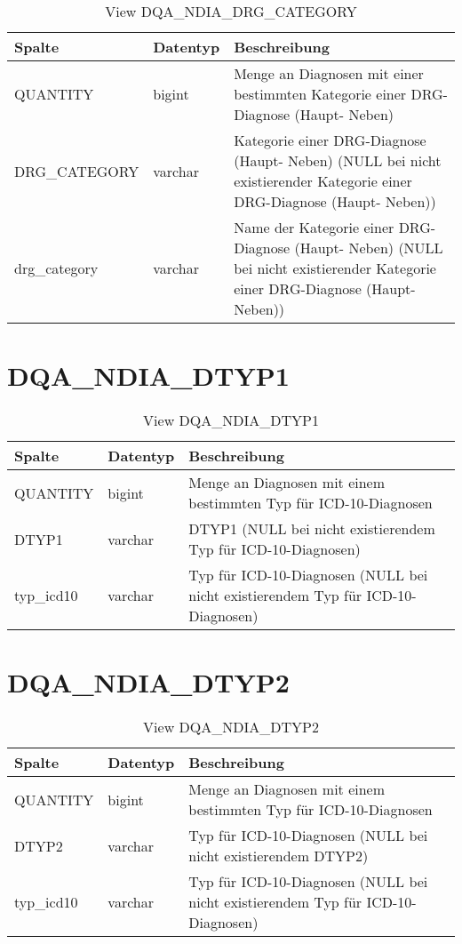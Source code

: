  \begin{table}[ht]
    \centering
    \caption{View DQA\_NDIA\_DRG\_CATEGORY}
    \label{tab:dqandiadrgcategory}
    \begin{tabular}{||l|l|p{10cm}||}
      \hline
      Spalte & Datentyp & Beschreibung \\ [0.5ex] \hline \hline
QUANTITY & bigint & Menge an Diagnosen mit einer bestimmten Kategorie einer DRG-Diagnose (Haupt- Neben) \\ \hline
DRG\_CATEGORY & varchar & Kategorie einer DRG-Diagnose (Haupt- Neben) (NULL bei nicht existierender Kategorie einer DRG-Diagnose (Haupt- Neben))\\ \hline
drg\_category & varchar & Name der Kategorie einer DRG-Diagnose (Haupt- Neben) (NULL bei nicht existierender Kategorie einer DRG-Diagnose (Haupt- Neben))\\ \hline
    \end{tabular}
  \end{table}

  \section{DQA\_NDIA\_DTYP1}

  \begin{table}[ht]
    \centering
    \caption{View DQA\_NDIA\_DTYP1}
    \label{tab:dqandiadtyp1}
    \begin{tabular}{||l|l|p{10cm}||}
      \hline
      Spalte & Datentyp & Beschreibung \\ [0.5ex] \hline \hline
QUANTITY & bigint & Menge an Diagnosen mit einem bestimmten Typ für ICD-10-Diagnosen \\ \hline
DTYP1 & varchar & DTYP1 (NULL bei nicht existierendem Typ für ICD-10-Diagnosen)\\ \hline
typ\_icd10 & varchar & Typ für ICD-10-Diagnosen (NULL bei nicht existierendem Typ für ICD-10-Diagnosen)\\ \hline
    \end{tabular}
  \end{table}
\clearpage
  \section{DQA\_NDIA\_DTYP2}

  \begin{table}[ht]
    \centering
    \caption{View DQA\_NDIA\_DTYP2}
    \label{tab:dqandiadtyp2}
    \begin{tabular}{||l|l|p{10cm}||}
      \hline
      Spalte & Datentyp & Beschreibung \\ [0.5ex] \hline \hline
QUANTITY & bigint & Menge an Diagnosen mit einem bestimmten Typ für ICD-10-Diagnosen \\ \hline
DTYP2 & varchar & Typ für ICD-10-Diagnosen (NULL bei nicht existierendem DTYP2)\\ \hline
typ\_icd10 & varchar & Typ für ICD-10-Diagnosen (NULL bei nicht existierendem Typ für ICD-10-Diagnosen)\\ \hline
    \end{tabular}
  \end{table}

